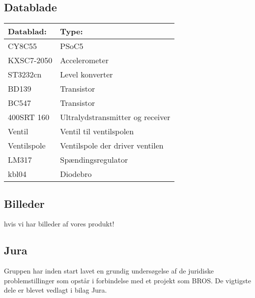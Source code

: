 \subsection{Datablade}
\begin{table}[H]
\begin{tabular}{|l|l|}
\hline
\textbf{Datablad:}& \textbf{Type:} \\\hline
CY8C55 & PSoC5 \\\hline
KXSC7-2050& Accelerometer\\\hline
ST3232cn & Level konverter \\\hline
BD139 & Transistor \\\hline
BC547 & Transistor \\\hline
400SRT 160 & Ultralydstransmitter og receiver \\\hline
Ventil & Ventil til ventilspolen \\\hline
Ventilspole & Ventilspole der driver ventilen \\\hline
LM317 & Spændingsregulator \\\hline
kbl04 & Diodebro \\\hline

\end{tabular}
\end{table}


\subsection{Billeder}
hvis vi har billeder af vores produkt!\\

\subsection{Jura}
Gruppen har inden start lavet en grundig undersøgelse af de juridiske problemstillinger som opstår i forbindelse med et projekt som BROS. De vigtigste dele er blevet vedlagt i bilag Jura.